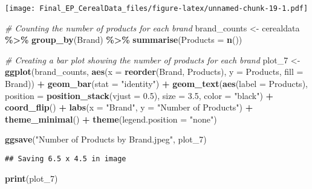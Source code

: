 \documentclass[
]{article}
\newenvironment{Shaded}{\begin{snugshade}}{\end{snugshade}}
\newcommand{\AttributeTok}[1]{\textcolor[rgb]{0.13,0.29,0.53}{#1}}
\newcommand{\CommentTok}[1]{\textcolor[rgb]{0.56,0.35,0.01}{\textit{#1}}}
\newcommand{\FloatTok}[1]{\textcolor[rgb]{0.00,0.00,0.81}{#1}}
\newcommand{\FunctionTok}[1]{\textcolor[rgb]{0.13,0.29,0.53}{\textbf{#1}}}
\newcommand{\NormalTok}[1]{#1}
\newcommand{\OtherTok}[1]{\textcolor[rgb]{0.56,0.35,0.01}{#1}}
\newcommand{\SpecialCharTok}[1]{\textcolor[rgb]{0.81,0.36,0.00}{\textbf{#1}}}
\newcommand{\StringTok}[1]{\textcolor[rgb]{0.31,0.60,0.02}{#1}}
\begin{document}
\texttt{[image: Final\_EP\_CerealData\_files/figure-latex/unnamed-chunk-19-1.pdf]}

\begin{Shaded}
\begin{Highlighting}[]
\CommentTok{\# Counting the number of products for each brand}
\NormalTok{brand\_counts }\OtherTok{\textless{}{-}}\NormalTok{ cerealdata }\SpecialCharTok{\%\textgreater{}\%}
  \FunctionTok{group\_by}\NormalTok{(Brand) }\SpecialCharTok{\%\textgreater{}\%}
  \FunctionTok{summarise}\NormalTok{(}\AttributeTok{Products =} \FunctionTok{n}\NormalTok{())}

\CommentTok{\# Creating a bar plot showing the number of products for each brand}
\NormalTok{plot\_7 }\OtherTok{\textless{}{-}} \FunctionTok{ggplot}\NormalTok{(brand\_counts, }\FunctionTok{aes}\NormalTok{(}\AttributeTok{x =} \FunctionTok{reorder}\NormalTok{(Brand, Products), }\AttributeTok{y =}\NormalTok{ Products, }\AttributeTok{fill =}\NormalTok{ Brand)) }\SpecialCharTok{+}
  \FunctionTok{geom\_bar}\NormalTok{(}\AttributeTok{stat =} \StringTok{"identity"}\NormalTok{) }\SpecialCharTok{+}
  \FunctionTok{geom\_text}\NormalTok{(}\FunctionTok{aes}\NormalTok{(}\AttributeTok{label =}\NormalTok{ Products), }\AttributeTok{position =} \FunctionTok{position\_stack}\NormalTok{(}\AttributeTok{vjust =} \FloatTok{0.5}\NormalTok{), }\AttributeTok{size =} \FloatTok{3.5}\NormalTok{, }\AttributeTok{color =} \StringTok{"black"}\NormalTok{) }\SpecialCharTok{+}
  \FunctionTok{coord\_flip}\NormalTok{() }\SpecialCharTok{+}
  \FunctionTok{labs}\NormalTok{(}\AttributeTok{x =} \StringTok{"Brand"}\NormalTok{,}
       \AttributeTok{y =} \StringTok{"Number of Products"}\NormalTok{) }\SpecialCharTok{+}
  \FunctionTok{theme\_minimal}\NormalTok{() }\SpecialCharTok{+}
  \FunctionTok{theme}\NormalTok{(}\AttributeTok{legend.position =} \StringTok{"none"}\NormalTok{)}

\FunctionTok{ggsave}\NormalTok{(}\StringTok{"Number of Products by Brand.jpeg"}\NormalTok{, plot\_7)}
\end{Highlighting}
\end{Shaded}

\begin{verbatim}
## Saving 6.5 x 4.5 in image
\end{verbatim}

\begin{Shaded}
\begin{Highlighting}[]
\FunctionTok{print}\NormalTok{(plot\_7)}
\end{Highlighting}
\end{Shaded}
\end{document}
